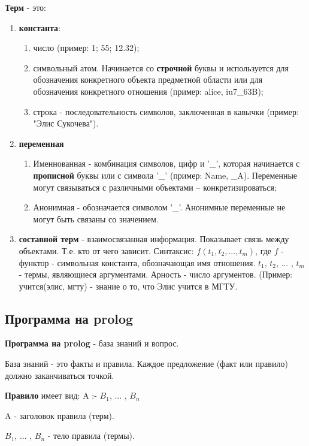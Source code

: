 \documentclass[a4paper,oneside,12pt]{extreport}
\begin{document}
\textbf{Терм} - это:
\begin{enumerate}
    \item \textbf{константа}:
    \begin{enumerate}
        \item число (пример: 1; 55; 12.32);
        \item символьный атом. Начинается со  \textbf{строчной} буквы и используется для обозначения конкретного объекта предметной области или для обозначения конкретного отношения (пример: alice, iu7\_63B);
        \item строка - последовательность символов, заключенная в кавычки (пример: "Элис Сукочева").
    \end{enumerate}
    \item \textbf{переменная}
    \begin{enumerate}
        \item Именнованная - комбинация символов, цифр и '\_', которая начинается с \textbf{прописной} буквы или с символа '\_' (пример: Name, \_A). Переменные могут связываться с различными объектами – конкретизироваться;
        \item Анонимная - обозначается символом '\_'. Анонимные переменные не могут быть связаны со значением.
    \end{enumerate}
    \item \textbf{составной терм} - взаимосвязанная информация. Показывает связь между объектами. Т.е. кто от чего зависит. 
    Синтаксис: \textbf{$f(t_1, t_2, ... , t_m)$}, где $f$ - функтор - символьная константа, обозначающая имя отношения. $t_1$, $t_2$, ... , $t_m$ - термы, являющиеся аргументами. Арность - число аргументов. (Пример: учится(элис, мгту) - знание о то, что Элис учится в МГТУ.
\end{enumerate}


\subsection*{Программа на prolog}

\textbf{Программа на prolog} - база знаний и вопрос. 

База знаний - это факты и правила. Каждое предложение (факт или правило) должно заканчиваться точкой.

\textbf{Правило} имеет вид:
    A :- $B_1$, ... , $B_n$
    
A - заголовок правила (терм).

$B_1$, ... , $B_n$ - тело правила (термы). 
\end{document}
